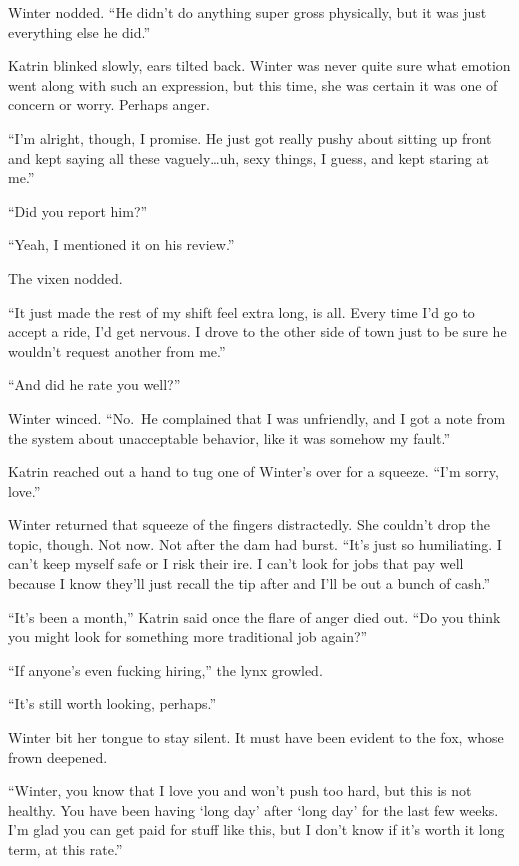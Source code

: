 Winter nodded. ``He didn't do anything super gross physically, but it was just everything else he did.''

Katrin blinked slowly, ears tilted back. Winter was never quite sure what emotion went along with such an expression, but this time, she was certain it was one of concern or worry. Perhaps anger.

``I'm alright, though, I promise. He just got really pushy about sitting up front and kept saying all these vaguely\ldots uh, sexy things, I guess, and kept staring at me.''

``Did you report him?''

``Yeah, I mentioned it on his review.''

The vixen nodded.

``It just made the rest of my shift feel extra long, is all. Every time I'd go to accept a ride, I'd get nervous. I drove to the other side of town just to be sure he wouldn't request another from me.''

``And did he rate you well?''

Winter winced. ``No.~He complained that I was unfriendly, and I got a note from the system about unacceptable behavior, like it was somehow my fault.''

Katrin reached out a hand to tug one of Winter's over for a squeeze. ``I'm sorry, love.''

Winter returned that squeeze of the fingers distractedly. She couldn't drop the topic, though. Not now. Not after the dam had burst. ``It's just so humiliating. I can't keep myself safe or I risk their ire. I can't look for jobs that pay well because I know they'll just recall the tip after and I'll be out a bunch of cash.''

``It's been a month,'' Katrin said once the flare of anger died out. ``Do you think you might look for something more traditional job again?''

``If anyone's even fucking hiring,'' the lynx growled.

``It's still worth looking, perhaps.''

Winter bit her tongue to stay silent. It must have been evident to the fox, whose frown deepened.

``Winter, you know that I love you and won't push too hard, but this is not healthy. You have been having `long day' after `long day' for the last few weeks. I'm glad you can get paid for stuff like this, but I don't know if it's worth it long term, at this rate.''

